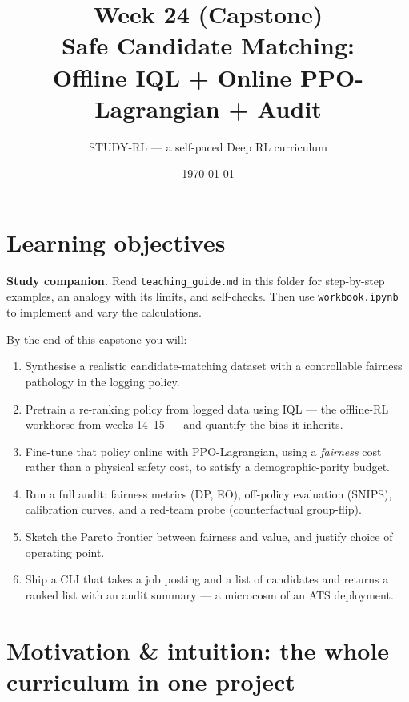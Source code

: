 \documentclass[11pt,oneside]{scrbook}
\title{{\color{rlblue}\textbf{Week 24 (Capstone)} \\ \Huge Safe Candidate Matching:\\ Offline IQL + Online PPO-Lagrangian + Audit}}
\author{STUDY-RL --- a self-paced Deep RL curriculum}
\date{\today}
\begin{document}
\maketitle
\tableofcontents
\newpage

\chapter*{Learning objectives}


\noindent\textbf{Study companion.} Read \texttt{teaching\_guide.md} in this
folder for step-by-step examples, an analogy with its limits, and self-checks.
Then use \texttt{workbook.ipynb} to implement and vary the calculations.
\par\medskip

\begin{keyidea}
By the end of this capstone you will:
\begin{enumerate}[leftmargin=*]
  \item Synthesise a realistic candidate-matching dataset with a
        controllable fairness pathology in the logging policy.
  \item Pretrain a re-ranking policy from logged data using IQL --- the
        offline-RL workhorse from weeks 14--15 --- and quantify the bias it
        inherits.
  \item Fine-tune that policy online with PPO-Lagrangian, using a
        \emph{fairness} cost rather than a physical safety cost, to satisfy
        a demographic-parity budget.
  \item Run a full audit: fairness metrics (DP, EO), off-policy evaluation
        (SNIPS), calibration curves, and a red-team probe (counterfactual
        group-flip).
  \item Sketch the Pareto frontier between fairness and value, and justify
        choice of operating point.
  \item Ship a CLI that takes a job posting and a list of candidates and
        returns a ranked list with an audit summary --- a microcosm of an
        ATS deployment.
\end{enumerate}
\end{keyidea}

\chapter{Motivation \& intuition: the whole curriculum in one project}
\end{document}
